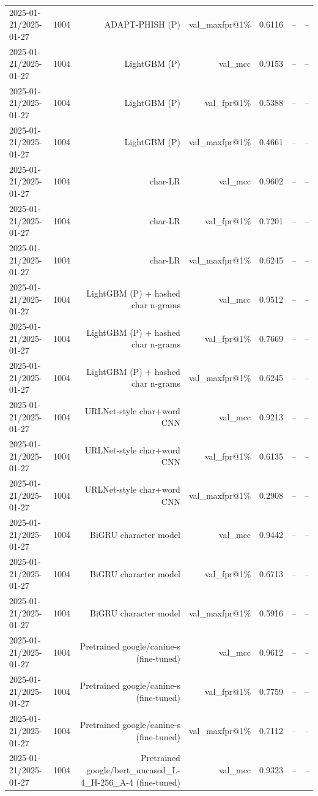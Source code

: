 \begin{table}[t]
\begin{tabular}{llrrrrr}
2025-01-21/2025-01-27 & 1004 & ADAPT-PHISH (P) & val\_maxfpr@1\% & 0.6116 & -- & -- \\
2025-01-21/2025-01-27 & 1004 & LightGBM (P) & val\_mcc & 0.9153 & -- & -- \\
2025-01-21/2025-01-27 & 1004 & LightGBM (P) & val\_fpr@1\% & 0.5388 & -- & -- \\
2025-01-21/2025-01-27 & 1004 & LightGBM (P) & val\_maxfpr@1\% & 0.4661 & -- & -- \\
2025-01-21/2025-01-27 & 1004 & char-LR & val\_mcc & 0.9602 & -- & -- \\
2025-01-21/2025-01-27 & 1004 & char-LR & val\_fpr@1\% & 0.7201 & -- & -- \\
2025-01-21/2025-01-27 & 1004 & char-LR & val\_maxfpr@1\% & 0.6245 & -- & -- \\
2025-01-21/2025-01-27 & 1004 & LightGBM (P) + hashed char n-grams & val\_mcc & 0.9512 & -- & -- \\
2025-01-21/2025-01-27 & 1004 & LightGBM (P) + hashed char n-grams & val\_fpr@1\% & 0.7669 & -- & -- \\
2025-01-21/2025-01-27 & 1004 & LightGBM (P) + hashed char n-grams & val\_maxfpr@1\% & 0.6245 & -- & -- \\
2025-01-21/2025-01-27 & 1004 & URLNet-style char+word CNN & val\_mcc & 0.9213 & -- & -- \\
2025-01-21/2025-01-27 & 1004 & URLNet-style char+word CNN & val\_fpr@1\% & 0.6135 & -- & -- \\
2025-01-21/2025-01-27 & 1004 & URLNet-style char+word CNN & val\_maxfpr@1\% & 0.2908 & -- & -- \\
2025-01-21/2025-01-27 & 1004 & BiGRU character model & val\_mcc & 0.9442 & -- & -- \\
2025-01-21/2025-01-27 & 1004 & BiGRU character model & val\_fpr@1\% & 0.6713 & -- & -- \\
2025-01-21/2025-01-27 & 1004 & BiGRU character model & val\_maxfpr@1\% & 0.5916 & -- & -- \\
2025-01-21/2025-01-27 & 1004 & Pretrained google/canine-s (fine-tuned) & val\_mcc & 0.9612 & -- & -- \\
2025-01-21/2025-01-27 & 1004 & Pretrained google/canine-s (fine-tuned) & val\_fpr@1\% & 0.7759 & -- & -- \\
2025-01-21/2025-01-27 & 1004 & Pretrained google/canine-s (fine-tuned) & val\_maxfpr@1\% & 0.7112 & -- & -- \\
2025-01-21/2025-01-27 & 1004 & Pretrained google/bert\_uncased\_L-4\_H-256\_A-4 (fine-tuned) & val\_mcc & 0.9323 & -- & -- \\

\end{tabular}
\end{table}
